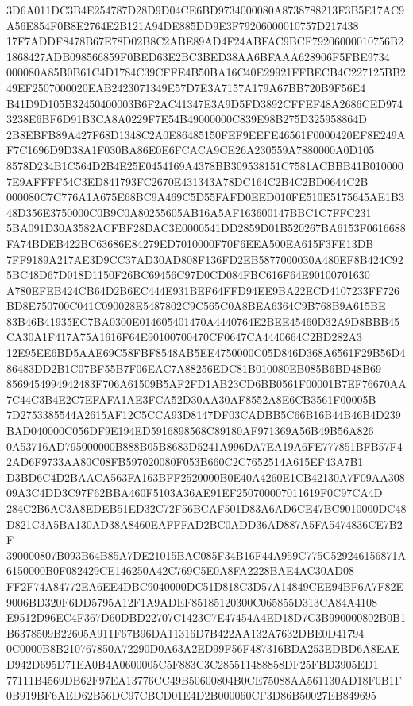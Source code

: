 \documentclass[UTF8,fontset=fandol,zihao=-4,a4paper]{ctexart}
\begin{document}
{{3D6A011DC3B4E254787D28D9D04CE6BD9734000080A8738788213F3B5E17AC9A56E854F0B8E2764E2B121A94DE885DD9E3F79206000010757D217438
17F7ADDF8478B67E78D02B8C2ABE89AD4F24ABFAC9BCF79206000010756B21868427ADB098566859F0BED63E2BC3BED38AA6BFAAA628906F5FBE9734
000080A85B0B61C4D1784C39CFFE4B50BA16C40E29921FFBECB4C227125BB249EF2507000020EAB2423071349E57D7E3A7157A179A67BB720B9F56E4
B41D9D105B32450400003B6F2AC41347E3A9D5FD3892CFFEF48A2686CED9743238E6BF6D91B3CA8A0229F7E54B49000000C839E98B275D325958864D
2B8EBFB89A427F68D1348C2A0E86485150FEF9EEFE46561F0000420EF8E249AF7C1696D9D38A1F030BA86E0E6FCACA9CE26A230559A7880000A0D105
8578D234B1C564D2B4E25E0454169A4378BB309538151C7581ACBBB41B0100007E9AFFFF54C3ED841793FC2670E431343A78DC164C2B4C2BD0644C2B
000080C7C776A1A675E68BC9A469C5D55FAFD0EED010FE510E5175645AE1B348D356E3750000C0B9C0A80255605AB16A5AF163600147BBC1C7FFC231
5BA091D30A3582ACFBF28DAC3E0000541DD2859D01B520267BA6153F0616688FA74BDEB422BC63686E84279ED7010000F70F6EEA500EA615F3FE13DB
7FF9189A217AE3D9CC37AD30AD808F136FD2EB5877000030A480EF8B424C925BC48D67D018D1150F26BC69456C97D0CD084FBC616F64E90100701630
A780EFEB424CB64D2B6EC444E931BEF64FFD94EE9BA22ECD4107233FF726BD8E750700C041C090028E5487802C9C565C0A8BEA6364C9B768B9A615BE
83B46B41935EC7BA0300E014605401470A4440764E2BEE45460D32A9D8BBB45CA30A1F417A75A1616F64E90100700470CF0647CA4440664C2BD282A3
12E95EE6BD5AAE69C58FBF8548AB5EE4750000C05D846D368A6561F29B56D486483DD2B1C07BF55B7F06EAC7A88256EDC81B010080EB085B6BD48B69
8569454994942483F706A61509B5AF2FD1AB23CD6BB0561F00001B7EF76670AA7C44C3B4E2C7EFAFA1AE3FCA52D30AA30AF8552A8E6CB3561F00005B
7D2753385544A2615AF12C5CCA93D8147DF03CADBB5C66B16B44B46B4D239BAD040000C056DF9E194ED5916898568C89180AF971369A56B49B56A826
0A53716AD795000000B888B05B8683D5241A996DA7EA19A6FE777851BFB57F42AD6F9733AA80C08FB597020080F053B660C2C7652514A615EF43A7B1
D3BD6C4D2BAACA563FA163BFF2520000B0E40A4260E1CB42130A7F09AA30809A3C4DD3C97F62BBA460F5103A36AE91EF250700007011619F0C97CA4D
284C2B6AC3A8EDEB51ED32C72F56BCAF501D83A6AD6CE47BC9010000DC48D821C3A5BA130AD38A8460EAFFFAD2BC0ADD36AD887A5FA5474836CE7B2F
390000807B093B64B85A7DE21015BAC085F34B16F44A959C775C529246156871A6150000B0F082429CE146250A42C769C5E0A8FA2228BAE4AC30AD08
FF2F74A84772EA6EE4DBC9040000DC51D818C3D57A14849CEE94BF6A7F82E9006BD320F6DD5795A12F1A9ADEF85185120300C065855D313CA84A4108
E9512D96EC4F367D60DBD22707C1423C7E47454A4ED18D7C3B990000802B0B1B6378509B22605A911F67B96DA11316D7B422AA132A7632DBE0D41794
0C0000B8B210767850A72290D0A63A2ED99F56F487316BDA253EDBD6A8EAED942D695D71EA0B4A0600005C5F883C3C285511488858DF25FBD3905ED1
77111B4569DB62F97EA13776CC49B50600804B0CE75088AA561130AD18F0B1F0B919BF6AED62B56DC97CBCD01E4D2B000060CF3D86B50027EB849695
}}
\end{document}
